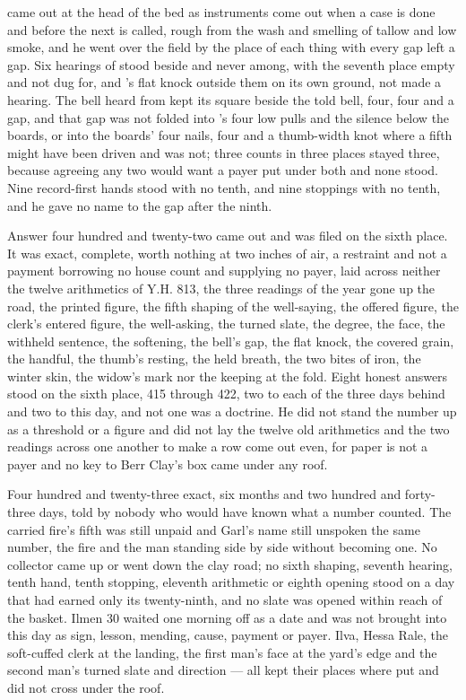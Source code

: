  came out at the head of the bed as instruments come out when a case is done and before the next is called, rough from the wash and smelling of tallow and low smoke, and he went over the field by the place of each thing with every gap left a gap. Six hearings of  stood beside and never among, with the seventh place empty and not dug for, and 's flat knock outside them on its own ground, not made a hearing. The bell heard from  kept its square beside the told bell, four, four and a gap, and that gap was not folded into 's four low pulls and the silence below the boards, or into the boards' four nails, four and a thumb-width knot where a fifth might have been driven and was not; three counts in three places stayed three, because agreeing any two would want a payer put under both and none stood. Nine record-first hands stood with no tenth, and nine stoppings with no tenth, and he gave no name to the gap after the ninth.

Answer four hundred and twenty-two came out and was filed on the sixth place. It was exact, complete, worth nothing at two inches of air, a restraint and not a payment borrowing no house count and supplying no payer, laid across neither the twelve arithmetics of Y.H. 813, the three readings of the year gone up the road, the printed figure, the fifth shaping of the well-saying, the offered figure, the clerk's entered figure, the well-asking, the turned slate, the degree, the face, the withheld sentence, the softening, the bell's gap, the flat knock, the covered grain, the handful, the thumb's resting, the held breath, the two bites of iron, the winter skin, the widow's mark nor the keeping at the fold. Eight honest answers stood on the sixth place, 415 through 422, two to each of the three days behind and two to this day, and not one was a doctrine. He did not stand the number up as a threshold or a figure and did not lay the twelve old arithmetics and the two readings across one another to make a row come out even, for paper is not a payer and no key to Berr Clay's box came under any roof.

Four hundred and twenty-three exact, six months and two hundred and forty-three days, told by nobody who would have known what a number counted. The carried fire's fifth was still unpaid and Garl's name still unspoken the same number, the fire and the man standing side by side without becoming one. No collector came up or went down the clay road; no sixth shaping, seventh hearing, tenth hand, tenth stopping, eleventh arithmetic or eighth opening stood on a day that had earned only its twenty-ninth, and no slate was opened within reach of the basket. Ilmen 30 waited one morning off as a date and was not brought into this day as sign, lesson, mending, cause, payment or payer. Ilva, Hessa Rale, the soft-cuffed clerk at the landing, the first man's face at the yard's edge and the second man's turned slate and direction --- all kept their places where put and did not cross under the roof.

